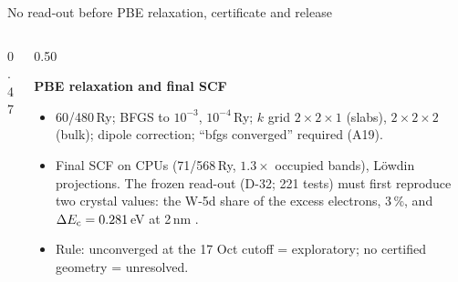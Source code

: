 \begin{frame}{No read-out before PBE relaxation, certificate and release}
\begin{columns}[T,onlytextwidth]
\begin{column}{0.47\textwidth}
\begin{itemize}
      \end{itemize}
    \end{column}
    \begin{column}{0.50\textwidth}
      {\footnotesize\textbf{PBE relaxation and final SCF}\par}
      \begin{itemize}
        \item 60/480\,Ry; BFGS to $10^{-3}$\elevenRyb, $10^{-4}$\,Ry; $k$ grid $2{\times}2{\times}1$ (slabs),
          $2{\times}2{\times}2$ (bulk); dipole correction; ``bfgs converged'' required (A19).
        \item Final SCF on CPUs (71/568\,Ry, $1.3\times$ occupied bands), L\"owdin projections. The frozen
          read-out (D-32; 221 tests) must first reproduce two crystal values: the W-5d share of the excess
          electrons, 3\,\%, and $\Delta E_{\mathrm{c}} = 0.281$\,eV at 2\,nm .
        \item Rule: unconverged at the 17 Oct cutoff = exploratory; no certified geometry = unresolved.
      \end{itemize}
    \end{column}
  \end{columns}
\end{frame}

